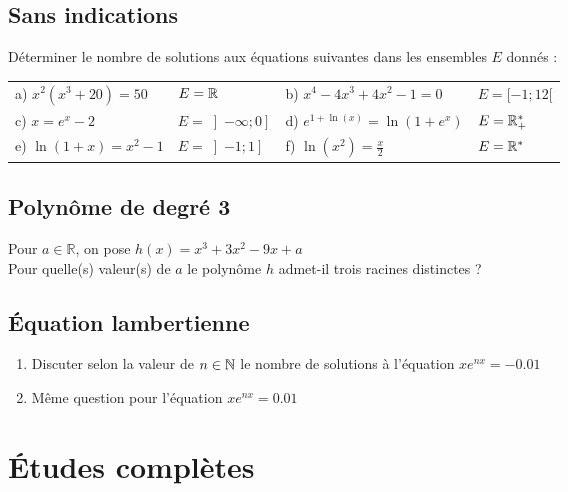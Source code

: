 \documentclass[oneside,12pt]{book}          %
\begin{document}
\subsection{Sans indications}
Déterminer le nombre de solutions aux équations suivantes dans les ensembles $E$ donnés :

\renewcommand{\arraystretch}{1.3}
\begin{tabular}{p{} p{} | p{} p{}}
    a) $x^2(x^3+20)=50$ & $E={\mathbb R}$ & b) $x^4-4x^3+4x^2-1=0$ & $E=[-1;12[$ \\
    c) $x=e^x-2$ & $E=\left]-\infty;0\right]$ & d) $e^{1+\ln(x)}=\ln(1+e^x)$ & $E={\mathbb R}_+^*$ \\
    e) $\ln(1+x)=x^2-1$ & $E=\left]-1;1\right]$ & f) $\ln(x^2)=\frac{x}{2}$ & $E={\mathbb R}^*$
\end{tabular}



\subsection{Polynôme de degré 3}
Pour $a \in \mathbb{R}$, on pose $h(x) = x^3 + 3x^2 - 9x + a$\\
Pour quelle(s) valeur(s) de $a$ le polynôme $h$ admet-il trois racines distinctes ?



\subsection{Équation lambertienne}
\begin{enumerate}
    \item Discuter selon la valeur de ${n\in\mathbb N}$ le nombre de solutions à l'équation $xe^{nx}=-0.01$
    \item Même question pour l'équation $xe^{nx}=0.01$
\end{enumerate}



\section{Études complètes}
\end{document}
